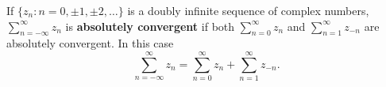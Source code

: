 If $\{z_n : n = 0, \pm 1, \pm 2, \ldots\}$ is a doubly infinite sequence of complex numbers, $\sum_{n=-\infty}^{\infty} z_n$ is \textbf{absolutely convergent} if both $\sum_{n=0}^{\infty} z_n$ and $\sum_{n=1}^{\infty} z_{-n}$ are absolutely convergent. In this case
$$\sum_{n=-\infty}^{\infty} z_n = \sum_{n=0}^{\infty} z_n + \sum_{n=1}^{\infty} z_{-n}.$$
